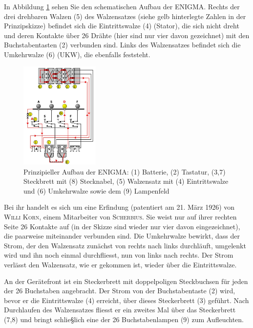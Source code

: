 \documentclass[%
11pt,%
twoside,%
titlepage,%
german,%
headsepline%
]{scrartcl}
\begin{document}
In Abbildung \ref{abb:enigmaschaltung} sehen Sie den schematischen Aufbau der ENIGMA.
Rechts der drei drehbaren Walzen (5) des Walzensatzes (siehe gelb hinterlegte Zahlen in der Prinzipskizze) befindet sich die Eintrittswalze (4) (Stator), die sich nicht dreht und deren Kontakte über 26 Drähte (hier sind nur vier davon gezeichnet) mit den Buchstabentasten (2) verbunden sind. Links des Walzensatzes befindet sich die Umkehrwalze (6) (UKW), die ebenfalls feststeht.
\begin{figure}
\begin{center}
\includegraphics[width=0.35\textwidth]{pictures/enigmaschaltung.jpg}
\caption{Prinzipieller Aufbau der ENIGMA: (1) Batterie, (2) Tastatur, (3,7) Steckbrett mit (8) Stecknabel, (5) Walzensatz mit (4) Eintrittswalze und (6) Umkehrwalze sowie dem (9) Lampenfeld}\label{abb:enigmaschaltung}
\end{center}
\end{figure}
Bei ihr handelt es sich um eine Erfindung (patentiert am 21. März 1926) von \textsc{Willi Korn}, einem Mitarbeiter von \textsc{Scherbius}. Sie weist nur auf ihrer rechten Seite 26 Kontakte auf (in der Skizze sind wieder nur vier davon eingezeichnet), die paarweise miteinander verbunden sind. Die Umkehrwalze bewirkt, dass der Strom, der den Walzensatz zunächst von rechts nach links durchläuft, umgelenkt wird und ihn noch einmal durchfliesst, nun von links nach rechts. Der Strom verlässt den Walzensatz, wie er gekommen ist, wieder über die Eintrittswalze.

An der Gerätefront ist ein Steckerbrett mit doppelpoligen Steckbuchsen für jeden der 26 Buchstaben angebracht. Der Strom von der Buchstabentaste (2) wird, bevor er die Eintrittswalze (4) erreicht, über dieses Steckerbrett (3) geführt. Nach Durchlaufen des Walzensatzes fliesst er ein zweites Mal über das Steckerbrett (7,8) und bringt schlie§lich eine der 26 Buchstabenlampen (9) zum Aufleuchten.
\end{document}
